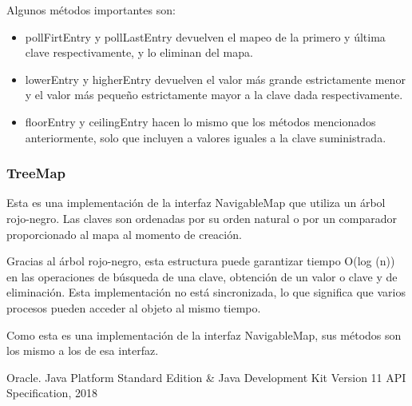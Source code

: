 \documentclass[11pt]{article}
\begin{document}
Algunos métodos importantes son:

\begin{itemize}



\item pollFirtEntry y pollLastEntry devuelven el mapeo de la primero 
y última clave respectivamente, y lo eliminan del mapa.

\item lowerEntry y higherEntry devuelven el valor más grande 
estrictamente menor y el valor más pequeño estrictamente mayor a la 
clave dada respectivamente.

\item floorEntry y ceilingEntry hacen lo mismo que los métodos 
mencionados anteriormente, solo que incluyen a valores iguales a la 
clave suministrada.



\end{itemize}



\subsubsection{TreeMap}

\par

Esta es una implementación de la interfaz NavigableMap que utiliza un 
árbol rojo-negro. Las claves son ordenadas por su orden natural o por 
un comparador proporcionado al mapa al momento de creación.

\par

Gracias al árbol rojo-negro, esta estructura puede garantizar tiempo 
O(log (n)) en las operaciones de búsqueda de una clave, obtención de 
un valor o clave y de eliminación. Esta implementación no está 
sincronizada, lo que significa que varios procesos pueden acceder al 
objeto al mismo tiempo.

\par

Como esta es una implementación de la interfaz NavigableMap, sus 
métodos son los mismo a los de esa interfaz.

\begin{thebibliography}{0}
 Oracle. Java Platform Standard Edition \& Java Development Kit
Version 11 API Specification, 2018
\end{thebibliography}
\end{document}
